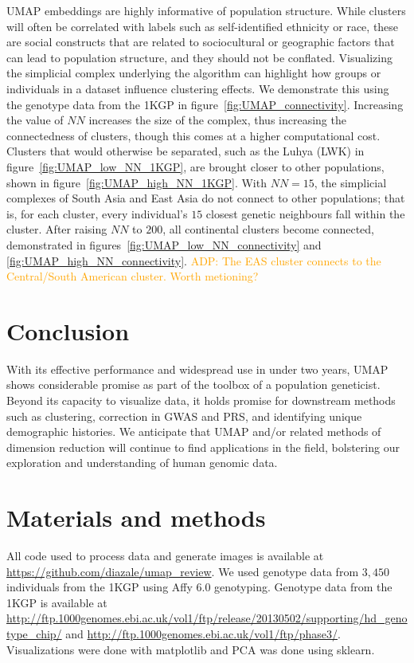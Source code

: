 \documentclass[12pt]{article}
\newcommand{\adpcomment}[1]{{\textcolor{orange}{ADP: #1}}}
\begin{document}
UMAP embeddings are highly informative of population structure. While clusters will often be correlated with labels such as self-identified ethnicity or race, these are social constructs that are related to sociocultural or geographic factors that can lead to population structure, and they should not be conflated. Visualizing the simplicial complex underlying the algorithm can highlight how groups or individuals in a dataset influence clustering effects. We demonstrate this using the genotype data from the 1KGP in figure~\ref{fig:UMAP_connectivity}. Increasing the value of $NN$ increases the size of the complex, thus increasing the connectedness of clusters, though this comes at a higher computational cost. Clusters that would otherwise be separated, such as the Luhya (LWK) in figure~\ref{fig:UMAP_low_NN_1KGP}, are brought closer to other populations, shown in figure~\ref{fig:UMAP_high_NN_1KGP}. With $NN=15$, the simplicial complexes of South Asia and East Asia do not connect to other populations; that is, for each cluster, every individual's $15$ closest genetic neighbours fall within the cluster. After raising $NN$ to $200$, all continental clusters become connected, demonstrated in figures~\ref{fig:UMAP_low_NN_connectivity} and \ref{fig:UMAP_high_NN_connectivity}. \adpcomment{The EAS cluster connects to the Central/South American cluster. Worth metioning?} 

\section*{Conclusion}
With its effective performance and widespread use in under two years, UMAP shows considerable promise as part of the toolbox of a population geneticist. Beyond its capacity to visualize data, it holds promise for downstream methods such as clustering, correction in GWAS and PRS, and identifying unique demographic histories. We anticipate that UMAP and/or related methods of dimension reduction will continue to find applications in the field, bolstering our exploration and understanding of human genomic data.

\section*{Materials and methods}
All code used to process data and generate images is available at \url{https://github.com/diazale/umap_review}. We used genotype data from $3,450$ individuals from the 1KGP using Affy 6.0 genotyping\cite{10002015global}. Genotype data from the 1KGP is available at \url{http://ftp.1000genomes.ebi.ac.uk/vol1/ftp/release/20130502/supporting/hd_genotype_chip/} and \url{http://ftp.1000genomes.ebi.ac.uk/vol1/ftp/phase3/}. Visualizations were done with matplotlib\cite{Hunter2007} and PCA was done using sklearn\cite{scikit-learn}.
\end{document}

